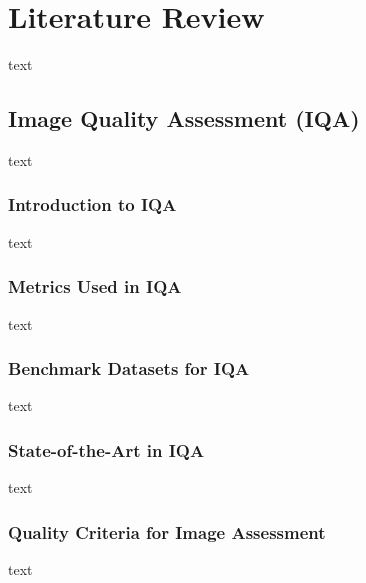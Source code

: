 \chapter{Literature Review}
\label{ch:LiteratureReview}
text

\section{Image Quality Assessment (IQA)}
\label{sec:OverviewTeledermatology}
text \par
\vspace{\baselineskip}
\noindent

\subsection{Introduction to IQA}
\label{sub:IntroductionIQA}
text \par
\vspace{\baselineskip}
\noindent

\subsection{Metrics Used in IQA}
\label{sub:MetricsIQA}
text \par
\vspace{\baselineskip}
\noindent

\subsection{Benchmark Datasets for IQA}
\label{sub:BenchmarkDatasetsIQA}
text \par
\vspace{\baselineskip}
\noindent

\subsection{State-of-the-Art in IQA}
\label{sub:SOTA_IQA}
text \par
\vspace{\baselineskip}
\noindent

\subsection{Quality Criteria for Image Assessment}
\label{sub:QualityCriteria}
text \par
\vspace{\baselineskip}
\noindent


